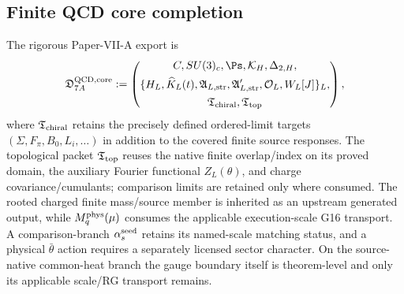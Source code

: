 \documentclass[12pt,a4paper]{article}
\providecommand{\alphasseed}{\alpha_s^{\rm seed}}
\begin{document}
\label{p10:part:completion-paper-xi-export}


\subsection{Finite QCD core completion}
\label{p10:sec:finite-qcd-core-completion}

\begin{definition}
\label{p10:def:finite-qcd-core-datum}
The rigorous Paper-VII-A export is
\begin{equation}
\label{p10:eq:finite-qcd-core-datum}
\mathfrak D_{7A}^{\rm QCD,core}:=
\left(\begin{gathered}
C,SU(3)_c,\Ps,\mathcal K_H,\Delta_{2,H},\\
\{H_L,\widehat K_L(t),\mathfrak A_{L,{\rm str}},
\mathfrak A'_{L,{\rm str}},\mathcal O_L,W_L[J]\}_L,\\
\mathfrak T_{\rm chiral},\mathfrak T_{\rm top}
\end{gathered}\right),
\end{equation}
where \(\mathfrak T_{\rm chiral}\) retains the precisely defined ordered-limit targets \((\Sigma,F_\pi,B_0,L_i,\ldots)\) in addition to the covered finite source responses.  The topological packet \(\mathfrak T_{\rm top}\) reuses the native finite overlap/index on its proved domain, the auxiliary Fourier functional \(Z_L(\theta)\), and charge covariance/cumulants; comparison limits are retained only where consumed.  The rooted charged finite mass/source member is inherited as an upstream generated output, while \(M_q^{\rm phys}(\mu)\) consumes the applicable execution-scale G16 transport.  A comparison-branch \(\alphasseed\) retains its named-scale matching status, and a physical \(\bar\theta\) action requires a separately licensed sector character.  On the source-native common-heat branch the gauge boundary itself is theorem-level and only its applicable scale/RG transport remains.
\end{definition}
\end{document}
